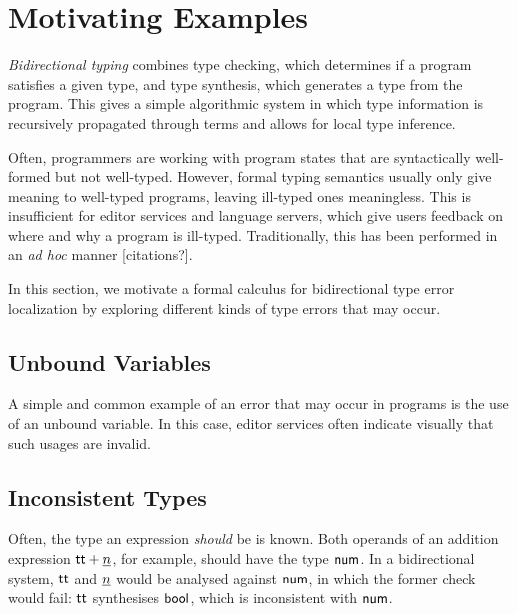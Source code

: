 \section{Motivating Examples}
\emph{Bidirectional typing} combines type checking, which determines if a program satisfies a given
type, and type synthesis, which generates a type from the program. This gives a simple algorithmic
system in which type information is recursively propagated through terms and allows for local type
inference.


Often, programmers are working with program states that are syntactically well-formed but not
well-typed. However, formal typing semantics usually only give meaning to well-typed programs,
leaving ill-typed ones meaningless. This is insufficient for editor services and language servers,
which give users feedback on where and why a program is ill-typed. Traditionally, this has been
performed in an \emph{ad hoc} manner [citations?].

In this section, we motivate a formal calculus for bidirectional type error localization by
exploring different kinds of type errors that may occur.


\subsection{Unbound Variables}
A simple and common example of an error that may occur in programs is the use of an unbound
variable. In this case, editor services often indicate visually that such usages are invalid.


\subsection{Inconsistent Types}
Often, the type an expression \emph{should} be is known. Both operands of an addition expression
${\normalfont\textsf{tt}} + \underline{n}$, for example, should have the type ${\normalfont\textsf{num}}$. In a bidirectional system,
${\normalfont\textsf{tt}}$ and $\underline{n}$ would be analysed against ${\normalfont\textsf{num}}$, in which the former check would fail:
${\normalfont\textsf{tt}}$ synthesises ${\normalfont\textsf{bool}}$, which is inconsistent with ${\normalfont\textsf{num}}$.

